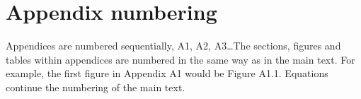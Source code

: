 \begin{itemize}
    
\end{itemize}





\section{Appendix numbering}
Appendices are numbered sequentially, A1, A2, A3\ldots The sections, figures and tables within appendices are numbered in the same way as in the main text. For example, the first figure in Appendix A1 would be Figure A1.1. Equations continue the numbering of the main text.



